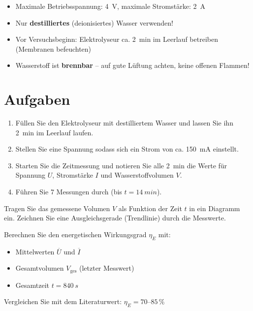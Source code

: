 \documentclass[11pt,a4paper]{scrartcl}
\begin{document}
	\begin{warnbox}[title={\faIcon{exclamation-triangle} Sicherheitshinweise}]
		\begin{itemize}
			\item Maximale Betriebsspannung: \SI{4}{V}, maximale Stromstärke: \SI{2}{A}
			\item Nur \textbf{destilliertes} (deionisiertes) Wasser verwenden!
			\item Vor Versuchsbeginn: Elektrolyseur ca. \SI{2}{min} im Leerlauf betreiben (Membranen befeuchten)
			\item Wasserstoff ist \textbf{brennbar} -- auf gute Lüftung achten, keine offenen Flammen!
		
		\end{itemize}
	\end{warnbox}
	
	\section*{Aufgaben}
	
	\begin{aufgabe}[title={\faIcon{pencil-alt} Aufgabe 1: Messung}]
		\begin{enumerate}
			\item Füllen Sie den Elektrolyseur mit destilliertem Wasser und lassen Sie ihn \SI{2}{min} im Leerlauf laufen.
			\item Stellen Sie eine Spannung sodass sich ein Strom von ca. \SI{150}{mA} einstellt.
			\item Starten Sie die Zeitmessung und notieren Sie alle \SI{2}{min} die Werte für Spannung $U$, Stromstärke $I$ und Wasserstoffvolumen $V$.
			\item Führen Sie 7 Messungen durch (bis $t = \SI{14}{min}$).
		\end{enumerate}
	\end{aufgabe}
	
	\begin{aufgabe}[title={\faIcon{pencil-alt} Aufgabe 2: $t$-$V$-Diagramm}]
		Tragen Sie das gemessene Volumen $V$ als Funktion der Zeit $t$ in ein Diagramm ein. Zeichnen Sie eine Ausgleichsgerade (Trendlinie) durch die Messwerte.
	\end{aufgabe}
	
	\begin{aufgabe}[title={\faIcon{pencil-alt} Aufgabe 3: Wirkungsgrad berechnen}]
		Berechnen Sie den energetischen Wirkungsgrad $\eta_E$ mit:
		\begin{itemize}
			\item Mittelwerten $\overline{U}$ und $\overline{I}$
			\item Gesamtvolumen $V_{\text{ges}}$ (letzter Messwert)
			\item Gesamtzeit $t = \SI{840}{s}$
		\end{itemize}
		Vergleichen Sie mit dem Literaturwert: $\eta_E = 70$--$85\,\%$
	\end{aufgabe}
	
\end{document}
